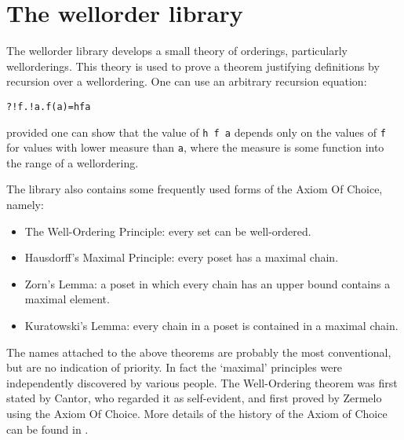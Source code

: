 \newcommand{\implies}{\Longrightarrow}
\newcommand{\Union}{\bigcup}
\newcommand{\union}{\cup}
\newcommand{\Intersect}{\bigcap}
\newcommand{\intersect}{\cap}
\newcommand{\ba}{\begin{array}[t]{l}}
\newcommand{\ea}{\end{array}}
\newcommand{\logand}{\wedge}
\newcommand{\logor}{\vee}

\chapter{The wellorder library}

The wellorder library develops a small theory of orderings, particularly
wellorderings. This theory is used to prove a theorem justifying definitions by
recursion over a wellordering. One can use an arbitrary recursion equation:

\begin{session}\begin{alltt}
?!f. !a. f(a) = h f a
\end{alltt}\end{session}

provided one can show that the value of {\tt h f a} depends only on the
values of {\tt f} for values with lower measure than {\tt a}, where the measure
is some function into the range of a wellordering.

The library also contains some frequently used forms of the Axiom Of Choice,
namely:

\begin{itemize}

\item The Well-Ordering Principle: every set can be well-ordered.

\item Hausdorff's Maximal Principle: every poset has a maximal chain.

\item Zorn's Lemma: a poset in which every chain has an upper bound contains a
maximal element.

\item Kuratowski's Lemma: every chain in a poset is contained in a maximal
chain.

\end{itemize}

The names attached to the above theorems are probably the most conventional,
but are no indication of priority. In fact the `maximal' principles were
independently discovered by various people. The Well-Ordering theorem was first
stated by Cantor, who regarded it as self-evident, and first proved by Zermelo
using the Axiom Of Choice. More details of the history of the Axiom of Choice
can be found in \cite{moore}.


